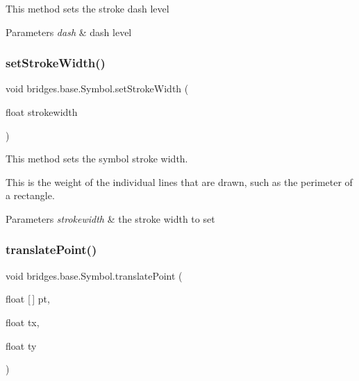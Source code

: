 This method sets the stroke dash level


\begin{DoxyParams}{Parameters}
{\em dash} & dash level \\
\hline
\end{DoxyParams}
\mbox{\label{classbridges_1_1base_1_1_symbol_a68f46f0e555e916c59a69d2b3e9e495d}} 
\subsubsection{\texorpdfstring{setStrokeWidth()}{setStrokeWidth()}}
{\footnotesize\ttfamily void bridges.\+base.\+Symbol.\+set\+Stroke\+Width (\begin{DoxyParamCaption}\item[{float}]{strokewidth }\end{DoxyParamCaption})}



This method sets the symbol stroke width. 

This is the weight of the individual lines that are drawn, such as the perimeter of a rectangle.


\begin{DoxyParams}{Parameters}
{\em strokewidth} & the stroke width to set \\
\hline
\end{DoxyParams}
\mbox{\label{classbridges_1_1base_1_1_symbol_affb384e1e7e22d7bcb6ca0bf0d4ebbc3}} 
\subsubsection{\texorpdfstring{translatePoint()}{translatePoint()}}
{\footnotesize\ttfamily void bridges.\+base.\+Symbol.\+translate\+Point (\begin{DoxyParamCaption}\item[{float \mbox{[}$\,$\mbox{]}}]{pt,  }\item[{float}]{tx,  }\item[{float}]{ty }\end{DoxyParamCaption})\hspace{0.3cm}{\ttfamily [protected]}}

